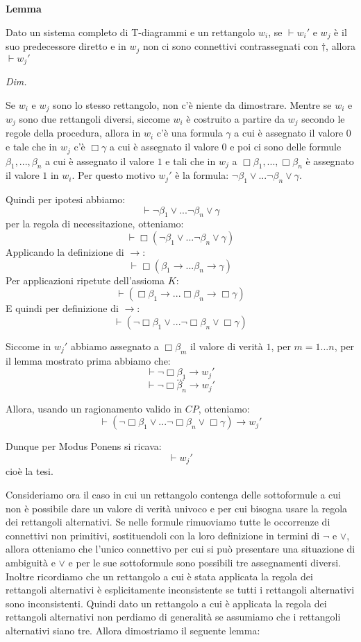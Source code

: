 \documentclass[a4paper, titlepage, 12pt]{report}
\begin{document}
\begin{flushleft}
\textbf{Lemma}

Dato un sistema completo di T-diagrammi e un rettangolo $w_i$, se $\vdash w_i'$
e $w_j$ è il suo predecessore diretto e in $w_j$ non ci sono connettivi contrassegnati
con $\dagger$,
allora $\vdash w_j'$

\textit{Dim.}

Se $w_i$ e $w_j$ sono lo stesso rettangolo, non c'è niente da dimostrare.
Mentre se $w_i$ e $w_j$ sono due rettangoli diversi, siccome $w_i$ è costruito
a partire da $w_j$ secondo le regole della procedura, allora in $w_i$ c'è
una formula $\gamma$ a cui è assegnato il valore $0$ e tale che in $w_j$ c'è
$\Box \gamma$ a cui è assegnato il valore $0$ e poi ci sono delle formule
$\beta_1, ..., \beta_n$ a cui è assegnato il valore $1$ e tali che in $w_j$
a $\Box \beta_1, ..., \Box \beta_n$ è assegnato il valore $1$ in $w_i$.
Per questo motivo $w_j'$ è la formula: $\neg \beta_1 \lor ... \neg \beta_n \lor \gamma$.

Quindi per ipotesi abbiamo:
$$\vdash \neg \beta_1 \lor ... \neg \beta_n \lor \gamma$$
per la regola di necessitazione, otteniamo:
$$\vdash \Box(\neg \beta_1 \lor ... \neg \beta_n \lor \gamma)$$
Applicando la definizione di $\rightarrow$:
$$\vdash \Box(\beta_1 \rightarrow ... \beta_n \rightarrow \gamma)$$
Per applicazioni ripetute dell'assioma $K$:
$$\vdash (\Box \beta_1 \rightarrow ... \Box \beta_n \rightarrow \Box \gamma)$$
E quindi per definizione di $\rightarrow$:
$$\vdash (\neg \Box \beta_1 \lor ... \neg \Box \beta_n \lor \Box \gamma)$$

Siccome in $w_j'$ abbiamo assegnato a $\Box \beta_m$ il valore di verità $1$, per $m = 1...n$,
per il lemma mostrato prima abbiamo che:
$$\vdash \neg \Box \beta_1 \rightarrow w_j'$$
$$...$$
$$\vdash \neg \Box \beta_n \rightarrow w_j'$$

Allora, usando un ragionamento valido in $CP$, otteniamo:
$$\vdash (\neg \Box \beta_1 \lor ... \neg \Box \beta_n \lor \Box \gamma) \rightarrow w_j'$$

Dunque per Modus Ponens si ricava:
$$\vdash w_j'$$
cioè la tesi.

\end{flushleft}

Consideriamo ora il caso in cui un rettangolo contenga delle sottoformule
a cui non è possibile dare un valore di verità univoco e per cui bisogna
usare la regola dei rettangoli alternativi. Se nelle formule rimuoviamo
tutte le occorrenze di connettivi non primitivi, sostituendoli con la loro definizione
in termini di $\neg$ e $\lor$, allora otteniamo che l'unico connettivo
per cui si può presentare una situazione di ambiguità e $\lor$ e per le sue sottoformule
sono possibili tre assegnamenti diversi. Inoltre ricordiamo che un rettangolo a cui è stata applicata
la regola dei rettangoli alternativi è esplicitamente inconsistente se tutti i
rettangoli alternativi sono inconsistenti. Quindi dato un rettangolo
a cui è applicata la regola dei rettangoli alternativi non perdiamo di generalità
se assumiamo che i rettangoli alternativi siano tre. Allora dimostriamo il seguente lemma:
\end{document}
